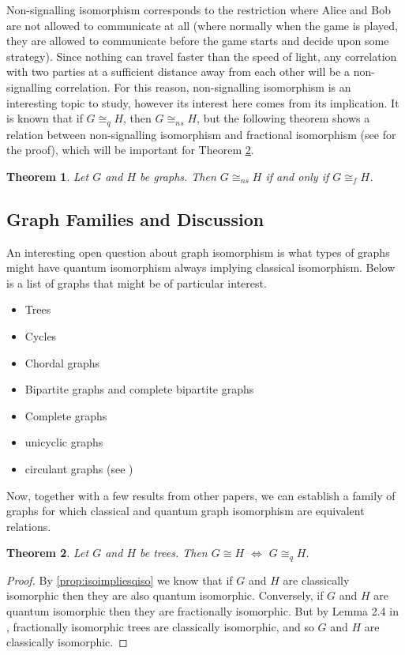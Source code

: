 \documentclass[12pt]{article}
\newtheorem{thm}{Theorem}[section]
\begin{document}
Non-signalling isomorphism corresponds to the restriction where Alice and Bob are not allowed to communicate at all (where normally when the game is played, they are allowed to communicate before the game starts and decide upon some strategy). Since nothing can travel faster than the speed of light, any correlation with two parties at a sufficient distance away from each other will be a non-signalling correlation. For this reason, non-signalling isomorphism is an interesting topic to study, however its interest here comes from its implication. It is known that if $G \cong_q H$, then $G \cong_{ns}H$, but the following theorem shows a relation between non-signalling isomorphism and fractional isomorphism (see \cite{laura} for the proof), which will be important for Theorem \ref{Trees}.

\begin{thm}
Let $G$ and $H$ be graphs. Then $G \cong_{ns} H$ if and only if $G \cong_f H$.
\end{thm}

\subsection{Graph Families and Discussion}
An interesting open question about graph isomorphism is what types of graphs might have quantum isomorphism always implying classical isomorphism. Below is a list of graphs that might be of particular interest.
\begin{itemize}
\item Trees
\item Cycles
\item Chordal graphs
\item Bipartite graphs and complete bipartite graphs
\item Complete graphs 
\item unicyclic graphs
\item circulant graphs (see \cite{circulant})
\end{itemize}
Now, together with a few results from other papers, we can establish a family of graphs for which classical and quantum graph isomorphism are equivalent relations.

\begin{thm}
\label{Trees}
Let $G$ and $H$ be trees. Then $G \cong H$ $\Leftrightarrow$ $G \cong_q H$.
\end{thm}
\begin{proof}
By \cref{prop:isoimpliesqiso} we know that if $G$ and $H$ are classically isomorphic then they are also quantum isomorphic. Conversely, if $G$ and $H$ are quantum isomorphic then they are fractionally isomorphic. But by Lemma 2.4 in \cite{fractional}, fractionally isomorphic trees are classically isomorphic, and so $G$ and $H$ are classically isomorphic. 
\end{proof}
\end{document}
